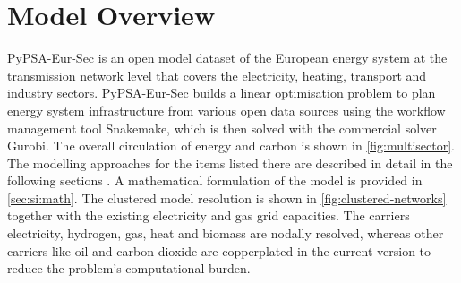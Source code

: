 \section{Model Overview}
\label{sec:si:model-overview}


PyPSA-Eur-Sec is an open model dataset of the European energy system at the
transmission network level that covers the electricity, heating, transport and
industry sectors. PyPSA-Eur-Sec builds a linear optimisation problem to plan
energy system infrastructure from various open data sources using the workflow
management tool Snakemake, which is then solved with the
commercial solver Gurobi. The overall circulation of energy and
carbon is shown in \cref{fig:multisector}. The modelling approaches for the
items listed there are described in detail in the following sections
. A mathematical
formulation of the model is provided in \cref{sec:si:math}. The clustered model
resolution is shown in \cref{fig:clustered-networks} together with the existing
electricity and gas grid capacities. The carriers electricity, hydrogen, gas, heat
and biomass are nodally resolved, whereas other carriers like oil and
carbon dioxide are copperplated in the current version to reduce the problem's
computational burden.

